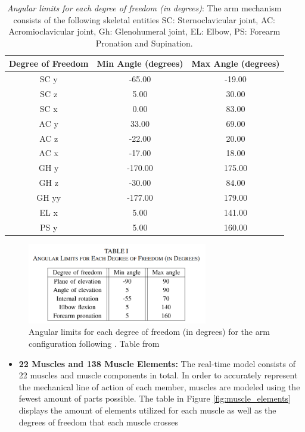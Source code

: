 \begin{table}[h!]
\centering
\caption {\textit{Angular limits for each degree of freedom (in degrees)}: The arm mechanism consists of the following skeletal entities SC: Sternoclavicular joint, AC: Acromioclavicular joint, Gh: Glenohumeral joint, EL: Elbow, PS: Forearm Pronation and Supination.}
\label{table:11dof}
\begin{tabular}{ccc}
\hline
\textbf{Degree of Freedom} & \textbf{Min Angle (degrees)} & \textbf{Max Angle (degrees)} \\
\hline
SC y & -65.00 & -19.00 \\
SC z & 5.00 & 30.00 \\
SC x & 0.00 & 83.00 \\
AC y & 33.00 & 69.00 \\
AC z & -22.00 & 20.00 \\
AC x & -17.00 & 18.00 \\
GH y & -170.00 & 175.00 \\
GH z & -30.00 & 84.00 \\
GH yy & -177.00 & 179.00 \\
EL x & 5.00 & 141.00 \\
PS y & 5.00 & 160.00 \\
\hline
\end{tabular}

\end{table}

\begin{figure}[h!]
    \centering
    \includegraphics[width=0.7\textwidth]{Pictures/DAS/5dof.png}
    \caption{Angular limits for each degree of freedom (in degrees) for the arm configuration following \cite{ISB}. Table from \cite{RT3D}}
    \label{fig:5dof}
\end{figure}
\newpage
\begin{itemize}
    \item \textbf{22 Muscles and 138 Muscle Elements:} The real-time model consists of 22 muscles and muscle components in total. In order to accurately represent the mechanical line of action of each member, muscles are modeled using the fewest amount of parts possible. The table in Figure  \ref{fig:muscle_elements} displays the amount of elements utilized for each muscle as well as the degrees of freedom that each muscle crosses 
    
\end{itemize}

